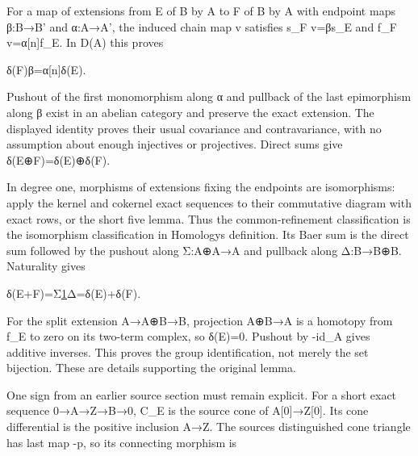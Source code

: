 \documentclass[11pt]{article}
\begin{document}
For a map of extensions from E of B by A to F of B\textquotesingle{} by A\textquotesingle{} with endpoint maps β:\allowbreak{}B\allowbreak{}→B' and α:\allowbreak{}A\allowbreak{}→A',\allowbreak{} the induced chain map v satisfies s\_\allowbreak{}F v\allowbreak{}=βs\_\allowbreak{}E and f\_\allowbreak{}F v\allowbreak{}=α[n]\allowbreak{}f\_\allowbreak{}E. In D(A)\allowbreak{} this proves

δ(F)\allowbreak{}β\allowbreak{}=α[n]\allowbreak{}δ(E)\allowbreak{}.

Pushout of the first monomorphism along α and pullback of the last epimorphism along β exist in an abelian category and preserve the exact extension. The displayed identity proves their usual covariance and contravariance,\allowbreak{} with no assumption about enough injectives or projectives. Direct sums give δ(E\allowbreak{}⊕F)\allowbreak{}\allowbreak{}=δ(E)\allowbreak{}\allowbreak{}⊕δ(F)\allowbreak{}.

In degree one,\allowbreak{} morphisms of extensions fixing the endpoints are isomorphisms:\allowbreak{} apply the kernel and cokernel exact sequences to their commutative diagram with exact rows,\allowbreak{} or the short five lemma. Thus the common-refinement classification is the isomorphism classification in Homology\textquotesingle s definition. Its Baer sum is the direct sum followed by the pushout along Σ:\allowbreak{}A\allowbreak{}⊕A\allowbreak{}→A and pullback along Δ:\allowbreak{}B\allowbreak{}→B\allowbreak{}⊕B. Naturality gives

δ(E\allowbreak{}+F)\allowbreak{}\allowbreak{}=Σ\href{δ(E)⊕δ(F)}{1}Δ\allowbreak{}=δ(E)\allowbreak{}\allowbreak{}+δ(F)\allowbreak{}.

For the split extension A\allowbreak{}→A\allowbreak{}⊕B\allowbreak{}→B,\allowbreak{} projection A\allowbreak{}⊕B\allowbreak{}→A is a homotopy from f\_\allowbreak{}E to zero on its two-term complex,\allowbreak{} so δ(E)\allowbreak{}\allowbreak{}=0. Pushout by -id\_\allowbreak{}A gives additive inverses. This proves the group identification,\allowbreak{} not merely the set bijection. These are details supporting the original lemma.

One sign from an earlier source section must remain explicit. For a short exact sequence 0\allowbreak{}→A\allowbreak{}→Z\allowbreak{}→B\allowbreak{}→0,\allowbreak{} C\_\allowbreak{}E is the source cone of A[0]\allowbreak{}\allowbreak{}→Z[0]\allowbreak{}. Its cone differential is the positive inclusion A\allowbreak{}→Z. The source\textquotesingle s distinguished cone triangle has last map -p,\allowbreak{} so its connecting morphism is
\end{document}
